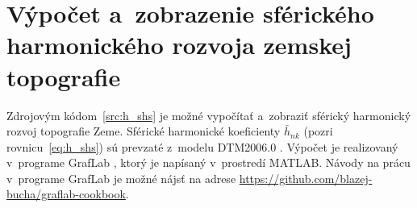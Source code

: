 \documentclass[a4paper, 12pt]{book}
\begin{document}






\chapter{Výpočet a~zobrazenie sférického harmonického rozvoja zemskej 
topografie}
\label{app:shs_topography}

Zdrojovým kódom~\ref{src:h_shs} je možné vypočítať a~zobraziť sférický 
harmonický rozvoj topografie Zeme.  Sférické harmonické koeficienty 
$\bar{h}_{nk}$ (pozri rovnicu~\ref{eq:h_shs}) sú prevzaté z~modelu DTM2006.0 
\citep{DTM2006}.  Výpočet je realizovaný v~programe GrafLab \citep{GrafLab}, 
ktorý je napísaný v~prostredí MATLAB.  Návody na prácu v~programe GrafLab je 
možné nájsť na adrese \url{https://github.com/blazej-bucha/graflab-cookbook}.






\end{document}

